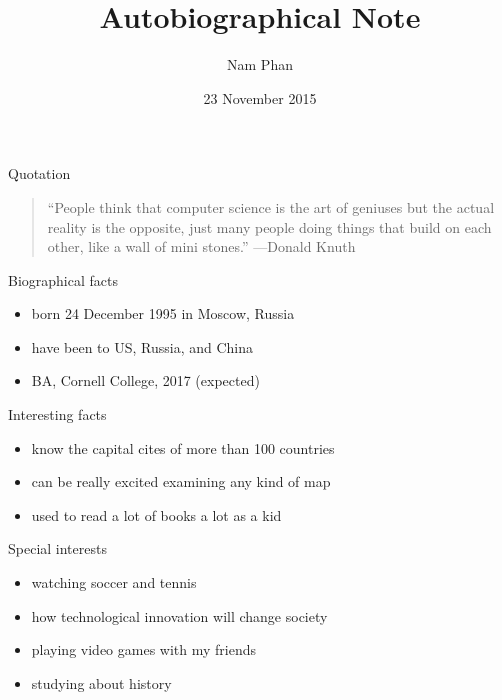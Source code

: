 \documentclass{beamer}
\title{Autobiographical Note}
\author{Nam Phan}
\institute{Cornell College}
\date{23 November 2015}
\begin{document}
\begin{frame}
  \titlepage
\end{frame}

\begin{frame}{Quotation}
\begin{quotation}
\noindent
``People think that computer science is the art of geniuses but the actual reality is the opposite, just many people doing things that build on each other, like a wall of mini stones.''
  \flushright
  ---Donald Knuth
  \end{quotation}
\end{frame}

\begin{frame}{Biographical facts}
\begin{itemize}
  \item born 24 December 1995 in Moscow, Russia
  \item have been to US, Russia, and China
  \item BA, Cornell College, 2017 (expected)
  
  \end{itemize}
\end{frame}

\begin{frame}{Interesting facts}
\begin{itemize}
  \item know the capital cites of more than 100 countries
  \item can be really excited examining any kind of map
  \item used to read a lot of books a lot as a kid
  \end{itemize}
\end{frame}

\begin{frame}{Special interests}
\begin{itemize}
  \item watching soccer and tennis
  \item how technological innovation will
    change society 
  \item playing video games with my friends
  \item studying about history
  \end{itemize}
\end{frame}
\end{document}
